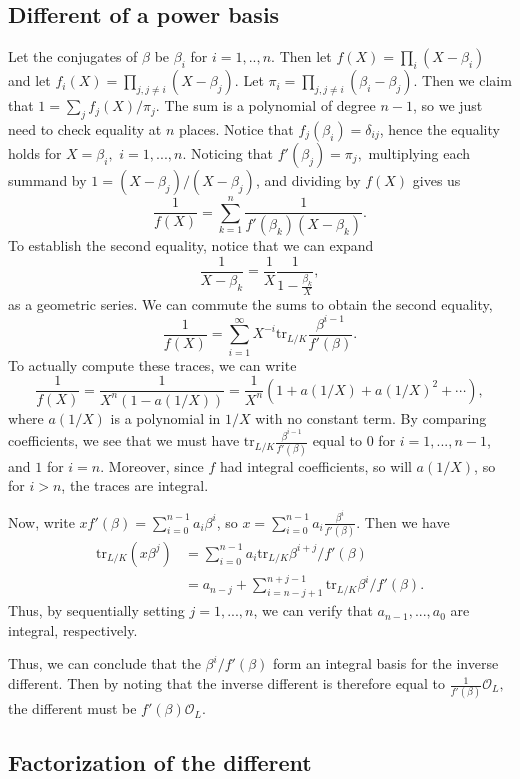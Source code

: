 \documentclass[12pt]{amsart}
\theoremstyle{named}
\newcommand{\roi}[1]{\mathcal{O}_{#1}}
\newcommand{\tr}{\mathrm{tr}}
\begin{document}
\subsection{Different of a power basis} Let the conjugates of $\beta$ be $\beta_i$ for $i =
1,..,n$. Then let $f(X) = \prod_i (X - \beta_i)$ and let $f_i(X) = \prod_{j, j \neq i} (X -
\beta_j)$. Let $\pi_i = \prod_{j, j \neq i} (\beta_i - \beta_j)$. Then we claim that $1 = \sum_j
f_j(X)/\pi_j$. The sum is a polynomial of degree $n - 1$, so we just need to check equality at $n$
places. Notice that $f_j(\beta_i) = \delta_{ij}$, hence the equality holds for $X = \beta_i,$ $i =
1,...,n$. Noticing that $f'(\beta_j) = \pi_j,$ multiplying each summand by $1 = (X - \beta_j)/(X -
\beta_j)$, and dividing by $f(X)$ gives us \[ \dfrac{1}{f(X)} = \sum_{k = 1}^n \dfrac{1}{f'(\beta_k)
(X - \beta_k)}. \] To establish the second equality, notice that we can expand \[ \dfrac{1}{X -
\beta_k} = \dfrac{1}{X} \dfrac{1}{1 - \frac{\beta_k}{X}}, \] as a geometric series. We can commute
the sums to obtain the second equality, \[\dfrac{1}{f(X)} = \sum_{i = 1}^\infty X^{-i} \tr_{L/K}
\dfrac{\beta^{i - 1}}{f'(\beta)}.\] To actually compute these traces, we can write \[
\dfrac{1}{f(X)} = \dfrac{1}{X^n(1 - a(1/X))} = \dfrac{1}{X^n} (1 + a(1/X) + a(1/X)^2 + \cdots ), \]
where $a(1/X)$ is a polynomial in $1/X$ with no constant term. By comparing coefficients, we see
that we must have $\tr_{L/K} \frac{\beta^{i - 1}}{f'(\beta)}$ equal to $0$ for $i = 1, ..., n - 1$,
and $1$ for $i = n$. Moreover, since $f$ had integral coefficients, so will $a(1/X)$, so for $i >
n$, the traces are integral.

Now, write $x f'(\beta) = \sum_{i = 0}^{n - 1} a_i \beta^i$, so
$x = \sum_{i = 0}^{n - 1} a_i \frac{\beta^i}{f'(\beta)}.$ Then we have
\begin{align*}
\tr_{L/K} (x \beta^j) & = \sum_{i = 0}^{n - 1} a_i \tr_{L/K}{\beta^{i + j}/f'(\beta)} \\
& = a_{n - j} + \sum_{i = n - j + 1}^{n + j - 1} \tr_{L/K}{\beta^{i}/f'(\beta)}.
\end{align*}
Thus, by sequentially setting $j = 1, ..., n$, we can verify that $a_{n - 1}, ..., a_0$ are
integral, respectively.

Thus, we can conclude that the $\beta^i/f'(\beta)$ form an integral basis for the inverse different. 
Then by noting that the inverse different is therefore equal to $\frac{1}{f'(\beta)} \roi L,$
the different must be $f'(\beta) \roi L$.

\subsection{Factorization of the different}
\end{document}
